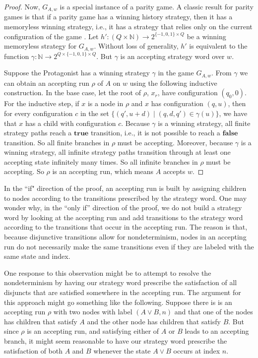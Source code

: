 \documentclass{lmcs}
\theoremstyle{definition}
\DeclareMathOperator{\?}{?}
\begin{document}
\begin{proof}
    Now, $G_{A,w}$ is a special instance of a parity game. A classic result for parity games
    is that if a parity game has a winning history strategy,
    then it has a memoryless winning strategy, i.e., it has a strategy that relies only on the current
    configuration of the game \cite{emersonandjutla}. Let
    $h' : (Q \times \mathbb{N}) \rightarrow 2^{\{-1,0,1\} \times Q}$ be a winning memoryless strategy for $G_{A,w}$.
    Without loss of generality, $h'$ is equivalent to the function $\gamma : \mathbb{N} \rightarrow 2^{Q \times \{-1,0,1\} \times Q}$.
    But $\gamma$ is an accepting strategy word over $w$.

    Suppose the Protagonist has a winning strategy $\gamma$ in the game $G_{A,w}$. From $\gamma$ we can obtain an accepting
    run $\rho$ of $A$ on $w$ using the following inductive construction.
    In the base case, let the root of $\rho$, $x_r$, have configuration $(q_0,0)$. For the inductive step,
    if $x$ is a node in $\rho$ and
    $x$ has configuration $(q,u)$, then for every configuration $c$ in the set $\{ (q',u+d) \mid (q,d,q') \in \gamma(u) \}$, we have that
    $x$ has a child with configuration $c$. Because $\gamma$ is a winning strategy, all finite strategy paths reach a $\textbf{true}$ transition,
    i.e., it is not possible to reach a $\textbf{false}$ transition. So all finite branches in $\rho$ must be accepting.
    Moreover, because $\gamma$ is a winning strategy, all infinite strategy paths transition through at least one accepting state infinitely many times.
    So all infinite branches in $\rho$ must be accepting. So $\rho$ is an accepting run, which means $A$ accepts $w$.
\end{proof}

In the ``if" direction of the proof,
an accepting run is built by assigning children to nodes according to the transitions prescribed by
the strategy word. One may wonder why, in the ``only if'' direction of the proof, we do not build a strategy word by looking at the accepting run
and add transitions to the strategy word according to the transitions that occur in the accepting run.
The reason is that, because disjunctive transitions allow for nondeterminism,
nodes in an accepting run do not necessarily make
the same transitions even if they are labeled with the same state and index.

One response to this observation might be to attempt to resolve the nondeterminism by having our
strategy word prescribe the satisfaction of all disjuncts that are satisfied somewhere in the
accepting run. The argument for this approach might go something like the following. Suppose there is is an accepting
run $\rho$ with two nodes with label $(A \vee B, n)$ and that one of the nodes has children that satisfy $A$ and the other
node has children that satisfy $B$. But since $\rho$ is an accepting run, and satisfying
either of $A$ or $B$ leads to an accepting branch, it might seem reasonable to have our strategy word prescribe
the satisfaction of both $A$ and $B$ whenever the state $A \vee B$ occurs at index $n$.
\end{document}
